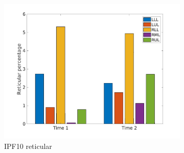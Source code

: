 \begin{figure}[H]
\begin{subfigure}{.46\linewidth}%
  \includegraphics[width=\linewidth,trim={{.0\wd0} {.0\wd0} {.0\wd0} {.0\wd0}},clip]{Appendix/Image_AppexA/LobarDistribution/IPF10ReticularLobarRegionDiseaseDistributionOverTime.jpg}
  \caption{IPF10 reticular}
  \label{fig:IPF10LobarRegionDiseaseDistributionOverTime-b}
\end{subfigure}
\begin{subfigure}{.46\linewidth}%

\end{subfigure}
\end{figure}
